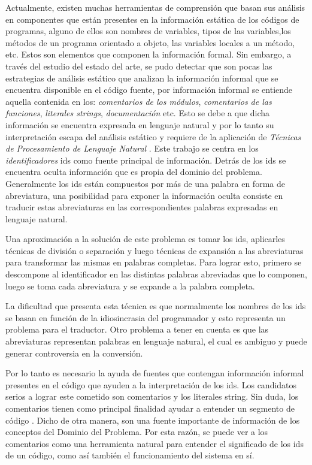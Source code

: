 \documentclass[12pt]{report}
\begin{document}
Actualmente, existen muchas herramientas de comprensión que basan sus análisis en componentes que están presentes en la información estática de los códigos de programas, alguno de ellos son nombres de variables, tipos de las variables,los métodos de un programa orientado a objeto, las variables locales a un método, etc. Estos son elementos que componen la información formal. Sin embargo, a través del estudio del estado del arte, se pudo detectar que son pocas las estrategias de análisis estático que analizan la información informal que se encuentra disponible en el código fuente, por información informal se entiende aquella contenida en 
los: \textit{comentarios de los módulos}, \textit{comentarios de las funciones}, \textit{literales strings}, \textit{documentación} etc.
Esto se debe a que dicha información se encuentra expresada en lenguaje natural y por lo tanto su interpretación escapa del análisis estático y requiere de la aplicación de \textit{Técnicas de Procesamiento de Lenguaje Natural} 
\cite{DCPHJP09,TERD01}.
Este trabajo se centra en los \textit{identificadores} ids como fuente principal de información. Detrás de los ids se encuentra oculta información que es propia del dominio del problema. Generalmente los ids están compuestos por más de una palabra en forma de abreviatura, una posibilidad para exponer la información oculta consiste en traducir estas abreviaturas en las correspondientes palabras expresadas en lenguaje natural.

Una aproximación a la solución de este problema es tomar los ids, 
aplicarles técnicas de división o separación y luego técnicas de expansión a las 
abreviaturas para transformar las mismas en palabras completas. 
Para lograr esto, primero se descompone al identificador en las distintas palabras 
abreviadas que lo componen, luego se toma cada abreviatura y se expande a la palabra completa.

La dificultad que presenta esta técnica es que normalmente los nombres de los ids se basan en función de la idiosincrasia del 
programador \cite{LFBEX07, EHPV09}
y esto representa un problema para el traductor. Otro problema a tener en cuenta es que las abreviaturas representan palabras en lenguaje natural, el cual es ambiguo y puede generar controversia en la conversión.

Por lo tanto es necesario la ayuda de fuentes que contengan información informal presentes en el código que ayuden a la interpretación de los ids. Los candidatos serios a lograr este cometido son comentarios y los literales string.
Sin duda, los comentarios tienen como principal finalidad ayudar a 
entender un segmento de código \cite{JDPH08}.
Dicho de otra manera, son una fuente importante de información de 
los conceptos del Dominio del Problema. 
Por esta razón, se puede ver a los comentarios como una herramienta 
natural para entender el significado de los ids de un código,
como así también el funcionamiento del sistema en sí.
\end{document}
